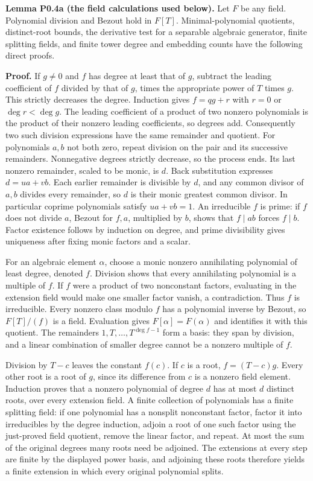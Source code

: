 \documentclass[11pt,a4paper,openany]{report}
\begin{document}
\textbf{Lemma P0.4a (the field calculations used below).} Let \(F\) be any field. Polynomial division and Bezout hold in \(F[T]\). Minimal-polynomial quotients, distinct-root bounds, the derivative test for a separable algebraic generator, finite splitting fields, and finite tower degree and embedding counts have the following direct proofs.

\textbf{Proof.} If \(g\ne0\) and \(f\) has degree at least that of \(g\), subtract the leading coefficient of \(f\) divided by that of \(g\), times the appropriate power of \(T\) times \(g\). This strictly decreases the degree. Induction gives \(f=qg+r\) with \(r=0\) or \(\deg r<\deg g\). The leading coefficient of a product of two nonzero polynomials is the product of their nonzero leading coefficients, so degrees add. Consequently two such division expressions have the same remainder and quotient. For polynomials \(a,b\) not both zero, repeat division on the pair and its successive remainders. Nonnegative degrees strictly decrease, so the process ends. Its last nonzero remainder, scaled to be monic, is \(d\). Back substitution expresses \(d=ua+vb\). Each earlier remainder is divisible by \(d\), and any common divisor of \(a,b\) divides every remainder, so \(d\) is their monic greatest common divisor. In particular coprime polynomials satisfy \(ua+vb=1\). An irreducible \(f\) is prime: if \(f\) does not divide \(a\), Bezout for \(f,a\), multiplied by \(b\), shows that \(f\mid ab\) forces \(f\mid b\). Factor existence follows by induction on degree, and prime divisibility gives uniqueness after fixing monic factors and a scalar.

For an algebraic element \(\alpha\), choose a monic nonzero annihilating polynomial of least degree, denoted \(f\). Division shows that every annihilating polynomial is a multiple of \(f\). If \(f\) were a product of two nonconstant factors, evaluating in the extension field would make one smaller factor vanish, a contradiction. Thus \(f\) is irreducible. Every nonzero class modulo \(f\) has a polynomial inverse by Bezout, so \(F[T]/(f)\) is a field. Evaluation gives \(F[\alpha]=F(\alpha)\) and identifies it with this quotient. The remainders \(1,T,\ldots,T^{\deg f-1}\) form a basis: they span by division, and a linear combination of smaller degree cannot be a nonzero multiple of \(f\).

Division by \(T-c\) leaves the constant \(f(c)\). If \(c\) is a root, \(f=(T-c)g\). Every other root is a root of \(g\), since its difference from \(c\) is a nonzero field element. Induction proves that a nonzero polynomial of degree \(d\) has at most \(d\) distinct roots, over every extension field. A finite collection of polynomials has a finite splitting field: if one polynomial has a nonsplit nonconstant factor, factor it into irreducibles by the degree induction, adjoin a root of one such factor using the just-proved field quotient, remove the linear factor, and repeat. At most the sum of the original degrees many roots need be adjoined. The extensions at every step are finite by the displayed power basis, and adjoining these roots therefore yields a finite extension in which every original polynomial splits.
\end{document}
